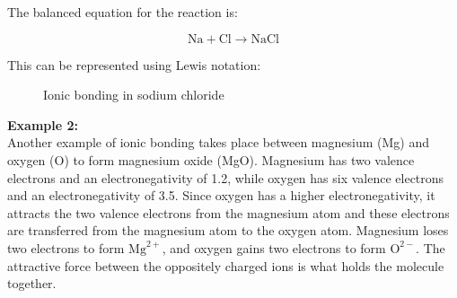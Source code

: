 The balanced equation for the reaction is:

\begin{equation*}
\text{Na} + \text{Cl} \rightarrow \text{NaCl}
\end{equation*}

This can be represented using Lewis notation:

\begin{figure}[H]
\begin{center}

\caption{Ionic bonding in sodium chloride}
\end{center}
\end{figure}


\textbf{Example 2:}\\

Another example of ionic bonding takes place between magnesium (Mg) and oxygen (O) to form magnesium oxide (MgO). Magnesium has two valence electrons and an electronegativity of 1.2, while oxygen has six valence electrons and an electronegativity of 3.5. Since oxygen has a higher electronegativity, it attracts the two valence electrons from the magnesium atom and these electrons are transferred from the magnesium atom to the oxygen atom. Magnesium loses two electrons to form $\text{Mg}^{2+}$, and oxygen gains two electrons to form $\text{O}^{2-}$. The attractive force between the oppositely charged ions is what holds the molecule together.\\

